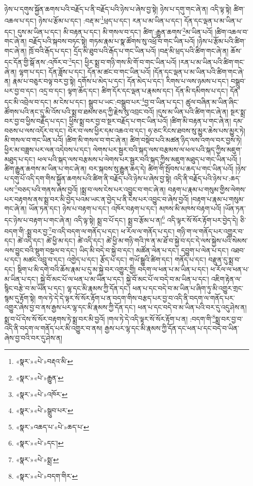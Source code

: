ཉེས་པ་དགུས་སྐྱོན་ཆགས་པའི་བརྗོད་པ་ནི་བརྗོད་པའི་ཉེས་པ་ཞེས་བྱ་སྟེ། ཉེས་པ་དགུ་གང་ཞེ་ན། འདི་ལྟ་སྟེ། ཚིག་འཆལ་པ་དང་། ཉེས་པ་རྩོམ་པ་དང་། :བརྡ་མ་\footnote{«སྣར་»«པེ་»བརྡའ་མི་}ཕྲད་པ་དང་། རན་པ་མ་ཡིན་པ་དང་། དོན་དང་ལྡན་པ་མ་ཡིན་པ་དང་། དུས་མ་ཡིན་པ་དང་། མི་བརྟན་པ་དང་། མི་གསལ་བ་དང་། ཚིག་:རྒྱུན་ཆགས་\footnote{«སྣར་»«པེ་»རྒྱུན་}མ་ཡིན་པའོ། །ཚིག་འཆལ་བ་གང་ཞེ་ན། བརྗོད་པའི་སྐབས་བཏང་སྟེ། གཏམ་རྣམ་པ་སྣ་ཚོགས་སུ་འཕྲོ་བ་གང་ཡིན་པའོ། །ཉེས་པ་རྩོམ་པའི་ཚིག་གང་ཞེ་ན། ཁྲོ་བའི་རྒོད་པ་དང་། དྲོད་མི་ཐུབ་པའི་རྒོད་པ་གང་ཡིན་པའོ། །བརྡ་མི་ཕྲད་པའི་ཚིག་གང་ཞེ་ན། ཆོས་དང་དོན་གྱི་སྒོ་ནས་:འཁོར་བ་\footnote{«སྣར་»«པེ་»འཁོར་}དང་། ཕྱིར་སྨྲ་བ་གཉི་གས་མི་གོ་བ་གང་ཡིན་པའོ། །རན་པ་མ་ཡིན་པའི་ཚིག་གང་ཞེ་ན། ལྷག་པ་དང་། དོན་ཟློས་པ་དང་། དོན་མ་ཚང་བ་གང་ཡིན་པའོ། །དོན་དང་ལྡན་པ་མ་ཡིན་པའི་ཚིག་གང་ཞེ་ན། རྣམ་པ་བཅུར་བལྟ་བར་བྱ་སྟེ། དགོས་པ་མེད་པ་དང་། དོན་མེད་པ་དང་། རིགས་པ་ལས་ཉམས་པ་དང་། བསྒྲུབ་པར་བྱ་བ་དང་། འདྲ་བ་དང་། ལྟག་ཆོད་དང་། ཚིག་དོར་དང་ལྡན་པ་རྣམས་དང་། དོན་མི་དམིགས་པ་དང་། དོན་དང་མི་འབྲེལ་བ་དང་། མ་ངེས་པ་དང་། སྒྲུབ་པ་ཡང་:བསྒྲུབ་པར་\footnote{«སྣར་»«པེ་»སྒྲུབ་པར་}བྱ་བ་ཡིན་པ་དང་། ཚུལ་བཞིན་མ་ཡིན་ཞིང་ཚོགས་པའི་ནང་དུ་མི་འོས་པའི་སྨྲ་བ་ཐམས་ཅད་ཀྱི་རྗེས་སུ་འབྲང་བའོ། །དུས་མ་ཡིན་པའི་ཚིག་གང་ཞེ་ན། སྔར་སྨྲ་བར་བྱ་བ་ཕྱིས་བརྗོད་པ་དང་། ཕྱིས་སྨྲ་བར་བྱ་བ་སྔར་བརྗོད་པ་གང་ཡིན་པའོ། །ཚིག་མི་བརྟན་པ་གང་ཞེ་ན། དམ་བཅས་པ་ལས་འདོར་བ་དང་། བོར་བ་ལས་ཕྱིར་དམ་འཆའ་བ་དང་། ཧ་ཅང་རིངས་ཐབས་སུ་མྱུར་ཆེས་པས་མྱུར་ཏེ། མི་གསལ་བ་གང་ཡིན་པའོ། །ཚིག་མི་གསལ་བ་གང་ཞེ་ན། ཚིག་བསྡེབ་པའི་མཚན་ཉིད་ལས་འགལ་བར་བྱས་ཏེ། ཕྱིར་མ་བཟླས་པར་ལན་འདེབས་པ་དང་། ལེགས་པར་སྦྱར་བའི་སྐད་ལས་བརྩམས་ལ་ཕལ་པའི་སྐད་ཀྱིས་མཇུག་མཐུད་པ་དང་། ཕལ་པའི་སྐད་ལས་བརྩམས་པ་ལེགས་པར་སྦྱར་བའི་སྐད་ཀྱིས་མཇུག་མཐུད་པ་གང་ཡིན་པའོ། །ཚིག་རྒྱུན་ཆགས་མ་ཡིན་པ་གང་ཞེ་ན། བར་སྐབས་སུ་རྒྱུན་ཆད་དེ། ཚིག་གི་སྤོབས་པ་ཆད་པ་གང་ཡིན་པའོ། །ཉེས་པ་དགུ་པོ་འདི་དག་གིས་སྐྱོན་ཆགས་པའི་ཚིག་ནི་བརྗོད་པའི་ཉེས་པ་ཞེས་བྱ་སྟེ། འདི་ནི་བརྗོད་པའི་ཉེས་པ་:ཆད་པས་\footnote{«སྣར་»འཆད་པ་«པེ་»ཆད་པ་}བཅད་པའི་གནས་ཞེས་བྱའོ། །སྨྲ་བ་ལས་ངེས་པར་འབྱུང་བ་གང་ཞེ་ན། བརྟག་པ་རྣམ་པ་གསུམ་གྱིས་ལེགས་པར་བརྟགས་ནས་སྨྲ་བར་མི་བྱེད་པའམ་ཡང་ན་བྱེད་པ་ནི་ངེས་པར་འབྱུང་བ་ཞེས་བྱའོ། །བརྟག་པ་རྣམ་པ་གསུམ་གང་ཞེ་ན། ཡོན་ཏན་དང་། ཉེས་པ་བརྟག་པ་དང་། འཁོར་བརྟག་པ་དང་། མཁས་མི་མཁས་བརྟག་པའོ། །ཡོན་ཏན་དང་ཉེས་པ་བརྟག་པ་གང་ཞེ་ན། འདི་ལྟ་སྟེ། སྨྲ་བ་པོ་དང་། སྨྲ་བ་རྩོམ་པ་ན།\footnote{«སྣར་»«པེ་»དང་།} འདི་ལྟར་སོ་སོར་རྟོག་པར་བྱེད་དེ། ཅི་བདག་གི་:སྨྲ་བར་བྱ་\footnote{«སྣར་»«པེ་»སྨྲ་}བ་འདི་བདག་ལ་གནོད་པ་དང་། ཕ་རོལ་ལ་གནོད་པ་དང་། གཉི་ག་ལ་གནོད་པར་འགྱུར་བ་དང་། ཚེ་འདི་དང་། ཚེ་ཕྱི་མ་དང་། ཚེ་འདི་དང་། ཚེ་ཕྱི་མ་གཉི་གའི་ཁ་ན་མ་ཐོ་བ་སྐྱེ་བ་དང་དེ་ལས་སྐྱེས་པའི་སེམས་ལས་བྱུང་བའི་སྡུག་བསྔལ་བ་དང་། ཡིད་མི་བདེ་བ་སྐྱེ་བ་དང་། མཚོན་ལེན་པ་དང་། དབྱུག་པ་ལེན་པ་དང་། འཐབ་པ་དང་། མཚང་འབྲུ་བ་དང་། འགྱེད་པ་དང་། རྩོད་པ་དང་། གཡོ་སྒྱུའི་ཚིག་དང་། གནོད་པ་དང་། བརྫུན་དུ་སྨྲ་བ་དང་། སྡིག་པ་མི་དགེ་བའི་ཆོས་རྣམ་པ་དུ་མ་སྐྱེ་བར་འགྱུར་གྱི། བདག་ལ་ཕན་པ་མ་ཡིན་པ་དང་། ཕ་རོལ་ལ་ཕན་པ་མ་ཡིན་པ་དང་། སྐྱེ་བོ་མང་པོ་ལ་ཕན་པ་མ་ཡིན་པ་དང་། སྐྱེ་བོ་མང་པོ་ལ་བདེ་བ་མ་ཡིན་པ་དང་། འཇིག་རྟེན་ལ་སྙིང་བརྩེ་བ་མ་ཡིན་པ་དང་། ལྷ་དང་མི་རྣམས་ཀྱི་དོན་དང་། ཕན་པ་དང་བདེ་བ་མ་ཡིན་པ་ཞིག་ཏུ་མི་འགྱུར་གྲང་སྙམ་དུ་རྟོག་སྟེ། གལ་ཏེ་དེ་དེ་ལྟར་སོ་སོར་རྟོག་པ་ན་བདག་གིས་བརྩད་པར་བྱ་བ་འདི་ནི་བདག་ལ་གནོད་པར་འགྱུར་ཞེས་བྱ་བ་ནས་རྒྱས་པར་ལྷ་དང་མི་རྣམས་ཀྱི་དོན་དང་། ཕན་པ་དང་བདེ་བ་མ་ཡིན་པའི་བར་དུ་འདུ་ཤེས་ན། སྨྲ་བ་པོ་དེས་སོ་སོར་བརྟགས་ཏེ་སྨྲ་བར་མི་བྱའོ། །གལ་ཏེ་དེ་འདི་ལྟར་སོ་སོར་རྟོག་པ་ན། :བདག་གི་\footnote{«སྣར་»«པེ་»བདག་གིར་}སྨྲ་བར་བྱ་བ་འདི་ནི་བདག་ལ་གནོད་པར་མི་འགྱུར་བ་ནས། རྒྱས་པར་ལྷ་དང་མི་རྣམས་ཀྱི་དོན་དང་ཕན་པ་དང་བདེ་བ་ཡིན་ཞེས་བྱ་བའི་བར་དུ་ཤེས་ན། 